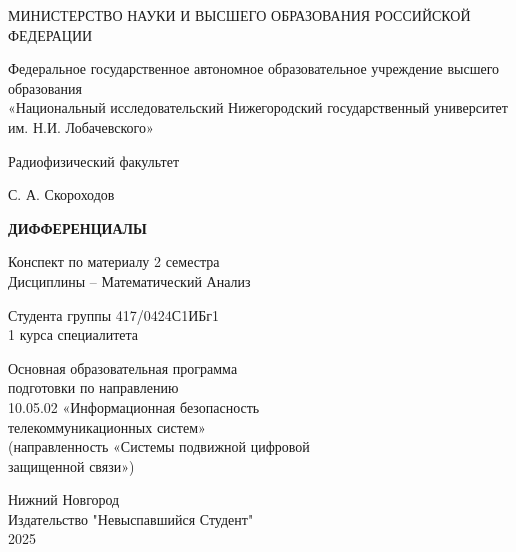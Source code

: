 \begin{titlepage}
	\centering
	\MakeUppercase{Министерство науки и высшего образования российской федерации}

	\vspace{1cm}
	Федеральное государственное автономное образовательное учреждение высшего образования\\
	«Национальный исследовательский Нижегородский государственный университет им. Н.И. Лобачевского»

	\vspace{1cm}
	Радиофизический факультет

	\vspace{1.5cm}
	С. А. Скороходов

	\vspace{1cm}
	{\Huge\bfseries\MakeUppercase{Дифференциалы}}

	\vspace{1cm}
	Конспект по материалу 2 семестра\\
	Дисциплины -- Математический Анализ

	\vspace{1cm}
	Студента группы 417/0424С1ИБг1\\
	1 курса специалитета

	\vspace{1cm}
	Основная образовательная программа\\
	подготовки по направлению\\
	10.05.02 «Информационная безопасность\\
	телекоммуникационных систем»\\
	(направленность «Системы подвижной цифровой\\
	защищенной связи»)

	\vfill
	Нижний Новгород \\ Издательство "Невыспавшийся Студент" \\ 2025
\end{titlepage}